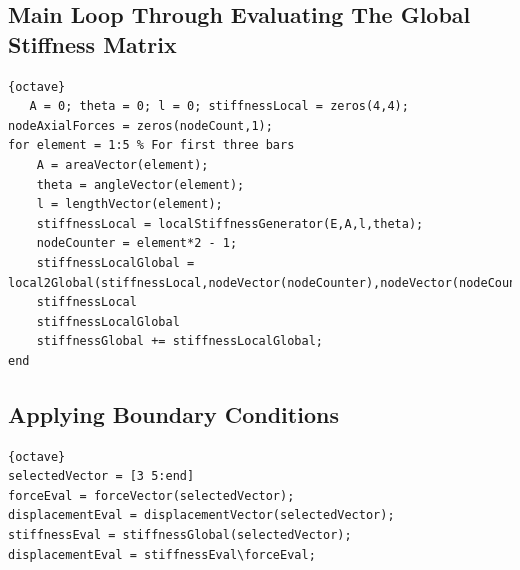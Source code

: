\documentclass{report}
\begin{document}
\subsection{Main Loop Through Evaluating The Global Stiffness Matrix}
\begin{lstlisting}{octave}
   A = 0; theta = 0; l = 0; stiffnessLocal = zeros(4,4); nodeAxialForces = zeros(nodeCount,1);
for element = 1:5 % For first three bars
    A = areaVector(element);
    theta = angleVector(element);
    l = lengthVector(element);
    stiffnessLocal = localStiffnessGenerator(E,A,l,theta);
    nodeCounter = element*2 - 1;
    stiffnessLocalGlobal = local2Global(stiffnessLocal,nodeVector(nodeCounter),nodeVector(nodeCounter+1),nodeCount);
    stiffnessLocal
    stiffnessLocalGlobal
    stiffnessGlobal += stiffnessLocalGlobal;
end
\end{lstlisting}
\subsection{Applying Boundary Conditions}
\begin{lstlisting}{octave}
selectedVector = [3 5:end]
forceEval = forceVector(selectedVector);
displacementEval = displacementVector(selectedVector);
stiffnessEval = stiffnessGlobal(selectedVector);
displacementEval = stiffnessEval\forceEval;
\end{lstlisting}
\end{document}
